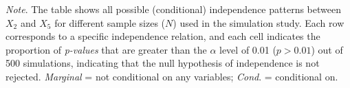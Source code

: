 \documentclass[twoside, 11pt]{article}
\renewcommand{\baselinestretch}{1.5}
\begin{document}
\begin{appendices}
\begin{table}[H]
\medskip
\renewcommand{\baselinestretch}{1}
\small\textit{Note}. The table shows all possible (conditional) independence patterns between $X_2$ and $X_5$ for different sample sizes ($N$) used in the simulation study. Each row corresponds to a specific independence relation, and each cell indicates the proportion of \textit{p-values} that are greater than the $\alpha$ level of 0.01 ($p > 0.01$) out of 500 simulations, indicating that the null hypothesis of independence is not rejected. \textit{Marginal} = not conditional on any variables; \textit{Cond}. = conditional on.
\end{table}



\newpage
{}
  

\end{appendices}
\end{document}
